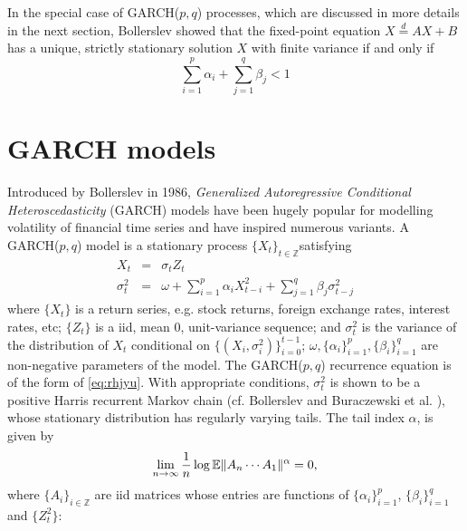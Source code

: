 In the special case of GARCH($p, q$) processes, which are discussed in
more details in the next section, Bollerslev \cite{bollerslev:1986}
showed that the fixed-point equation $X \overset{d}{=} A X + B$ has a
unique, strictly stationary solution $X$ with finite variance if and
only if
\begin{equation}
  \sum_{i=1}^p \alpha_i + \sum_{j=1}^q \beta_j < 1
  \label{eq:bollerslev:intro}
\end{equation}

\section{GARCH models}
Introduced by Bollerslev \cite{bollerslev:1986} in 1986,
{\em Generalized Autoregressive Conditional Heteroscedasticity}
(GARCH) models have been hugely popular for modelling volatility of
financial time series and have inspired numerous variants.
A GARCH($p, q$) model is a stationary process
$\{X_t\}_{t \in \mathbb Z}$satisfying
\begin{eqnarray*}
  X_t &=& \sigma_t Z_t \\
  \sigma_t^2 &=& \omega + \sum_{i=1}^p \alpha_i X_{t-i}^2 +
  \sum_{j=1}^q \beta_j \sigma_{t-j}^2
\end{eqnarray*}
where $\{X_t\}$ is a return series, e.g. stock returns, foreign exchange
rates, interest rates, etc; $\{Z_t\}$ is a iid, mean 0, unit-variance
sequence; and $\sigma_t^2$ is the variance of the
distribution of $X_t$ conditional on $\{(X_i,
\sigma_i^2)\}_{i=0}^{t-1}$; $\omega, \{\alpha_i\}_{i=1}^p,
\{\beta_i\}_{i=1}^q$ are non-negative parameters of the
model. The GARCH($p,q$) recurrence equation is of the form of
\eqref{eq:rhjyu}. With appropriate conditions, $\sigma_t^2$ is
shown to be a positive Harris recurrent Markov chain (cf. Bollerslev
\cite{bollerslev:1986} and Buraczewski et al.
\cite{buraczewski:damek:mikosch:2016}), whose stationary distribution
has regularly varying tails. The tail index $\alpha$, is given by
\begin{equation}
  \label{eq:grgbg}
  \lim_{n \to \infty} {1 \over n}\log\mathbb{E}\|A_n \cdots A_1\|^\alpha = 0,
\end{equation}
where $\{A_i\}_{i \in \mathbb Z}$ are iid matrices whose entries are
functions of $\{\alpha_i\}_{i=1}^p$, $\{\beta_i\}_{i=1}^q$ and
$\{Z_t^2\}$:

